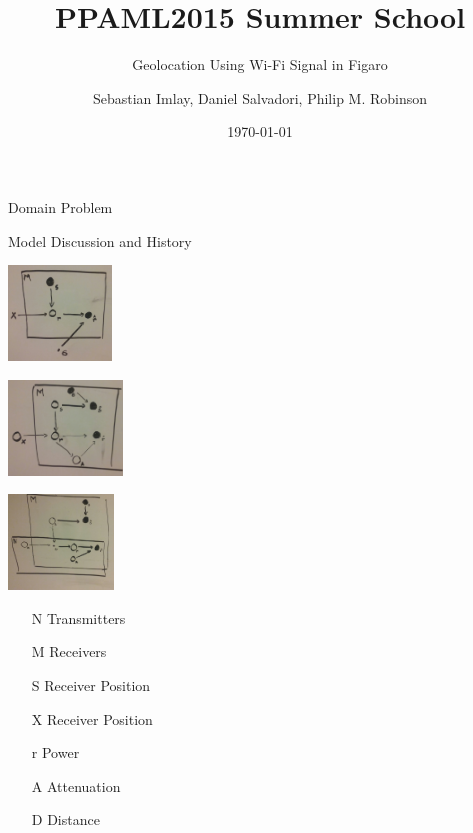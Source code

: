 \documentclass[11pt]{beamer}
\begin{document}
\title{PPAML2015 Summer School}

\subtitle{Geolocation Using Wi-Fi Signal in Figaro}

\author{Sebastian Imlay, Daniel Salvadori, Philip M. Robinson}


\date{\today}

\begin{frame}
  \titlepage
\end{frame}


\begin{frame}{Domain Problem}

\end{frame}

\begin{frame}{Model Discussion and History}
\begin{center}
\begin{multicols}{3}
\includegraphics[height=1in]{pictures/1plate.jpg}

\columnbreak

\includegraphics[height=1in]{pictures/2plate.jpg}

\columnbreak

\includegraphics[height=1in]{pictures/3plate.jpg}

\columnbreak
\end{multicols}
\end{center}
\begin{itemize}
\item[N] Transmitters
\item[M] Receivers
\item[S] Receiver Position
\item[X] Receiver Position
\item[r] Power
\item[A] Attenuation
\item[D] Distance
\end{itemize}

\end{frame}
\end{document}
